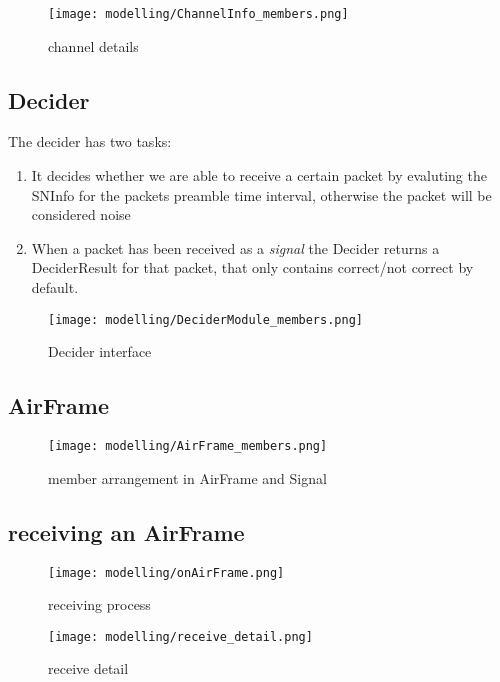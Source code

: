 \begin{figure}[h]
 \centering
 \texttt{[image: modelling/ChannelInfo\_members.png]}
 \caption{channel details}
 \label{fig: channel details}
\end{figure}



\subsection{Decider}

The decider has two tasks:
\begin{enumerate}
	\item It decides whether we are able to receive a certain packet by evaluting
	the SNInfo for the packets preamble time interval, otherwise the packet will 	be considered noise
	\item When a packet has been received as a \textit{signal} the Decider 	returns a DeciderResult for that packet, that only contains correct/not correct 	by default.
\end{enumerate}


\begin{figure}[h]
 \centering
 \texttt{[image: modelling/DeciderModule\_members.png]}
 \caption{Decider interface}
 \label{fig: Decider interface}
\end{figure}


\subsection{AirFrame}


\begin{figure}[h]
 \centering
 \texttt{[image: modelling/AirFrame\_members.png]}
 \caption{member arrangement in AirFrame and Signal}
 \label{fig: member AirFrame}
\end{figure}

\subsection{receiving an AirFrame}


\begin{figure}[h]
 \centering
 \texttt{[image: modelling/onAirFrame.png]}
 \caption{receiving process}
 \label{fig: receiving process}
\end{figure}

\begin{figure}[h]
 \centering
 \texttt{[image: modelling/receive\_detail.png]}
 \caption{receive detail}
 \label{fig: receive detail}
\end{figure}

